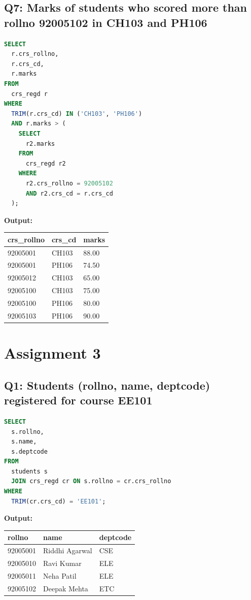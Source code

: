 \documentclass[11pt, a4paper]{article}
\begin{document}
\subsection*{Q7: Marks of students who scored more than rollno 92005102 in CH103 and PH106}
\begin{lstlisting}[language=SQL]
SELECT
  r.crs_rollno,
  r.crs_cd,
  r.marks
FROM
  crs_regd r
WHERE
  TRIM(r.crs_cd) IN ('CH103', 'PH106')
  AND r.marks > (
    SELECT
      r2.marks
    FROM
      crs_regd r2
    WHERE
      r2.crs_rollno = 92005102
      AND r2.crs_cd = r.crs_cd
  );
\end{lstlisting}
\vspace{0.3cm}
\textbf{Output:}\vspace{0.2cm}
\begin{center}
\begin{tabular}{|l|l|l|}
\hline
\textbf{crs\_rollno} & \textbf{crs\_cd} & \textbf{marks} \\ \hline
92005001 & CH103 & 88.00 \\ \hline
92005001 & PH106 & 74.50 \\ \hline
92005012 & CH103 & 65.00 \\ \hline
92005100 & CH103 & 75.00 \\ \hline
92005100 & PH106 & 80.00 \\ \hline
92005103 & PH106 & 90.00 \\ \hline
\end{tabular}
\end{center}
\newpage
\section{Assignment 3}
\subsection*{Q1: Students (rollno, name, deptcode) registered for course EE101}
\begin{lstlisting}[language=SQL]
SELECT
  s.rollno,
  s.name,
  s.deptcode
FROM
  students s
  JOIN crs_regd cr ON s.rollno = cr.crs_rollno
WHERE
  TRIM(cr.crs_cd) = 'EE101';
\end{lstlisting}
\vspace{0.3cm}
\textbf{Output:}\vspace{0.2cm}
\begin{center}
\begin{tabular}{|l|l|l|}
\hline
\textbf{rollno} & \textbf{name} & \textbf{deptcode} \\ \hline
92005001 & Riddhi Agarwal                 & CSE \\ \hline
92005010 & Ravi Kumar                     & ELE \\ \hline
92005011 & Neha Patil                     & ELE \\ \hline
92005102 & Deepak Mehta                   & ETC \\ \hline
\end{tabular}
\end{center}
\newpage
\end{document}
